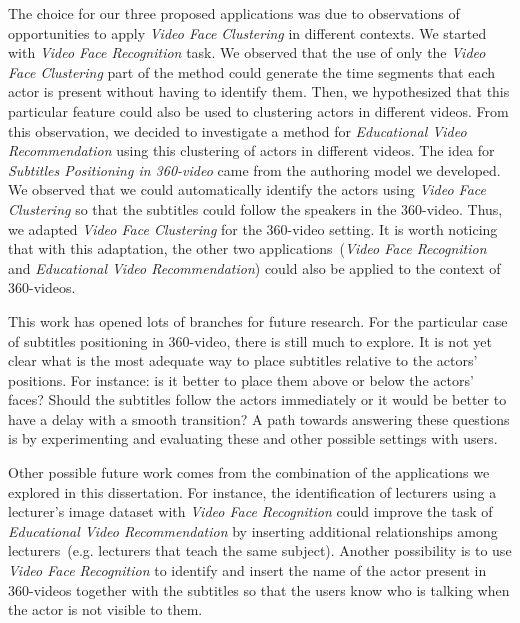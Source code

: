 The choice for our three proposed applications was due to observations of opportunities to apply \emph{Video Face Clustering} in different contexts. We started with \emph{Video Face Recognition} task. We observed that the use of only the \emph{Video Face Clustering} part of the method could generate the time segments that each actor is present without having to identify them. Then, we hypothesized that this particular feature could also be used to clustering actors in different videos. From this observation, we decided to investigate a method for \emph{Educational Video Recommendation} using this clustering of actors in different videos. The idea for \emph{Subtitles Positioning in 360-video} came from the authoring model we developed. We observed that we could automatically identify the actors using \emph{Video Face Clustering} so that the subtitles could follow the speakers in the 360-video. Thus, we adapted \emph{Video Face Clustering} for the 360-video setting. It is worth noticing that with this adaptation, the other two applications~(\emph{Video Face Recognition} and \emph{Educational Video Recommendation}) could also be applied to the context of 360-videos.

This work has opened lots of branches for future research. For the particular case of subtitles positioning in 360-video, there is still much to explore. It is not yet clear what is the most adequate way to place subtitles relative to the actors' positions. For instance: is it better to place them above or below the actors' faces? Should the subtitles follow the actors immediately or it would be better to have a delay with a smooth transition? A path towards answering these questions is by experimenting and evaluating these and other possible settings with users.

Other possible future work comes from the combination of the applications we explored in this dissertation. For instance, the identification of lecturers using a lecturer's image dataset with \emph{Video Face Recognition} could improve the task of \emph{Educational Video Recommendation} by inserting additional relationships among lecturers~(e.g. lecturers that teach the same subject). Another possibility is to use \emph{Video Face Recognition} to identify and insert the name of the actor present in 360-videos together with the subtitles so that the users know who is talking when the actor is not visible to them.

